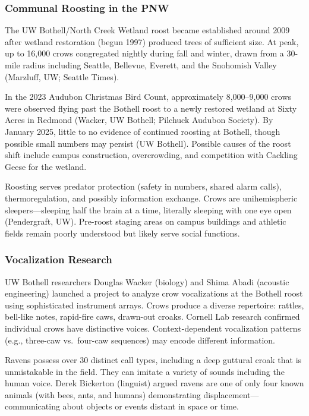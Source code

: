 \documentclass[11pt,letterpaper]{article}
\begin{document}
\subsubsection{Communal Roosting in the PNW}

The UW Bothell/North Creek Wetland roost became established around 2009 after wetland restoration (begun 1997) produced trees of sufficient size. At peak, up to 16,000 crows congregated nightly during fall and winter, drawn from a 30-mile radius including Seattle, Bellevue, Everett, and the Snohomish Valley (Marzluff, UW; Seattle Times).

In the 2023 Audubon Christmas Bird Count, approximately 8,000--9,000 crows were observed flying past the Bothell roost to a newly restored wetland at Sixty Acres in Redmond (Wacker, UW Bothell; Pilchuck Audubon Society). By January 2025, little to no evidence of continued roosting at Bothell, though possible small numbers may persist (UW Bothell). Possible causes of the roost shift include campus construction, overcrowding, and competition with Cackling Geese for the wetland.

Roosting serves predator protection (safety in numbers, shared alarm calls), thermoregulation, and possibly information exchange. Crows are unihemispheric sleepers---sleeping half the brain at a time, literally sleeping with one eye open (Pendergraft, UW). Pre-roost staging areas on campus buildings and athletic fields remain poorly understood but likely serve social functions.

\subsubsection{Vocalization Research}

UW Bothell researchers Douglas Wacker (biology) and Shima Abadi (acoustic engineering) launched a project to analyze crow vocalizations at the Bothell roost using sophisticated instrument arrays. Crows produce a diverse repertoire: rattles, bell-like notes, rapid-fire caws, drawn-out croaks. Cornell Lab research confirmed individual crows have distinctive voices. Context-dependent vocalization patterns (e.g., three-caw vs.\ four-caw sequences) may encode different information.

Ravens possess over 30 distinct call types, including a deep guttural croak that is unmistakable in the field. They can imitate a variety of sounds including the human voice. Derek Bickerton (linguist) argued ravens are one of only four known animals (with bees, ants, and humans) demonstrating displacement---communicating about objects or events distant in space or time.
\end{document}
